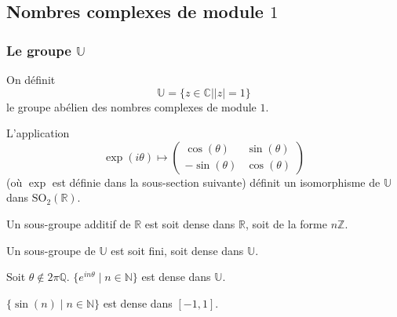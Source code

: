 



  \subsection{Nombres complexes de module \texorpdfstring{$1$}{1}}

  \subsubsection{Le groupe \texorpdfstring{$\mathbb{U}$}{U}}


  \begin{definition}
    On définit
    \[ \mathbb{U} = \{ z \in \mathbb{C} \mid \vert z \vert = 1 \} \]
    le groupe abélien des nombres complexes de module $1$.
  \end{definition}

  \begin{proposition}
    L'application
    \[ \exp(i\theta) \mapsto
      \begin{pmatrix}
        \cos(\theta) & \sin(\theta) \\
        -\sin(\theta) & \cos(\theta)
      \end{pmatrix}
    \]
    (où $\exp$ est définie dans la sous-section suivante) définit un isomorphisme de $\mathbb{U}$ dans $\mathrm{SO}_2(\mathbb{R})$.
  \end{proposition}


  \begin{proposition}
    Un sous-groupe additif de $\mathbb{R}$ est soit dense dans $\mathbb{R}$, soit de la forme $n\mathbb{Z}$.
  \end{proposition}

  \begin{corollary}
    Un sous-groupe de $\mathbb{U}$ est soit fini, soit dense dans $\mathbb{U}$.
  \end{corollary}

  \begin{corollary}
    Soit $\theta \notin 2\pi\mathbb{Q}$. $\{ e^{in\theta} \mid n \in \mathbb{N} \}$ est dense dans $\mathbb{U}$.
  \end{corollary}

  \begin{application}
    $\{ \sin(n) \mid n \in \mathbb{N} \}$ est dense dans $[-1,1]$.
  \end{application}

